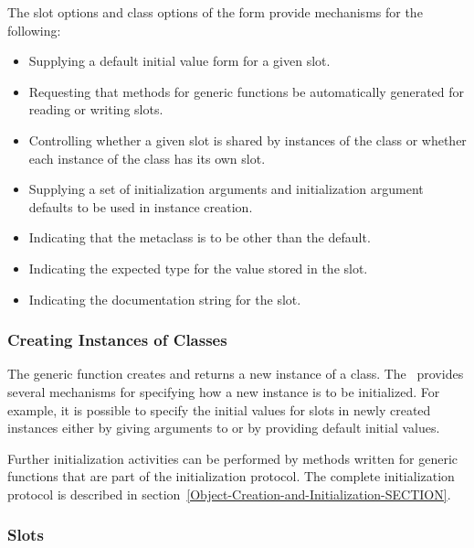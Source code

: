 The slot options and class options of the  form provide
mechanisms for the following:

\begin{itemize}
\item  Supplying a default initial value form for a given slot.  

\item  Requesting that methods for generic functions
be automatically generated for reading or writing slots. 

\item  Controlling whether a given slot is shared by instances
of the class or whether each instance of the class has its own slot.

\item  Supplying a set of initialization arguments and initialization
argument defaults to be used in instance creation.


\item  Indicating that the metaclass is to be other than the default.

\item  Indicating the expected type for the value stored in the slot.

\item  Indicating the documentation string for the slot.
\end{itemize} 

\subsubsection{Creating Instances of Classes}

The generic function  creates and returns a new
instance of a class.  The \OS\ provides several mechanisms for
specifying how a new instance is to be initialized.  For example, it
is possible to specify the initial values for slots in newly created
instances either by giving arguments to  or by
providing default initial values.

Further initialization activities
can be performed by methods written for generic functions that are
part of the initialization protocol.  The complete initialization
protocol is described in
section~\ref{Object-Creation-and-Initialization-SECTION}.

\subsubsection{Slots}


